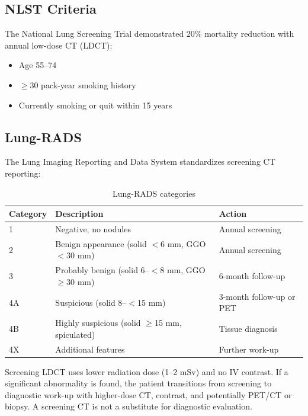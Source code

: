 \subsection{NLST Criteria}
The National Lung Screening Trial demonstrated 20\% mortality reduction with annual low-dose CT (LDCT):
\begin{itemize}
  \item Age 55--74
  \item $\geq$30 pack-year smoking history
  \item Currently smoking or quit within 15 years
\end{itemize}

\subsection{Lung-RADS}
The Lung Imaging Reporting and Data System standardizes screening CT reporting:

\begin{table}[h]
\centering
\caption{Lung-RADS categories}
\begin{tabular}{|l|l|l|}
\hline
\textbf{Category} & \textbf{Description} & \textbf{Action} \\
\hline
1 & Negative, no nodules & Annual screening \\
2 & Benign appearance (solid $<$6 mm, GGO $<$30 mm) & Annual screening \\
3 & Probably benign (solid 6--$<$8 mm, GGO $\geq$30 mm) & 6-month follow-up \\
4A & Suspicious (solid 8--$<$15 mm) & 3-month follow-up or PET \\
4B & Highly suspicious (solid $\geq$15 mm, spiculated) & Tissue diagnosis \\
4X & Additional features & Further work-up \\
\hline
\end{tabular}
\end{table}

\begin{pearlbox}
Screening LDCT uses lower radiation dose (1--2 mSv) and no IV contrast. If a significant abnormality is found, the patient transitions from screening to diagnostic work-up with higher-dose CT, contrast, and potentially PET/CT or biopsy. A screening CT is not a substitute for diagnostic evaluation.
\end{pearlbox}

